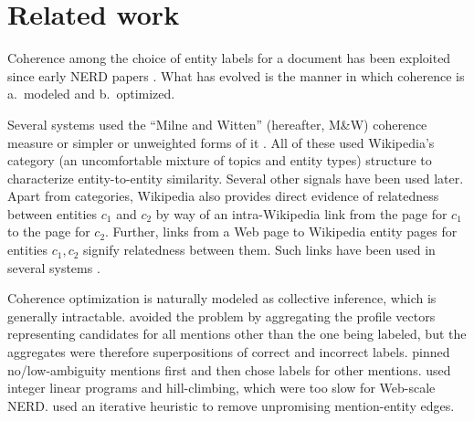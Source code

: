 \section{Related work}
\label{sec:related}

Coherence among the choice of entity labels for a document has been exploited since early NERD papers \cite{Cucerzan07,Milne2008}.  What has evolved is the manner in which coherence is a.~modeled and b.~optimized.

Several systems \cite{Milne2008,KulkarniSRC09,Hoffart2011} used the ``Milne and Witten'' (hereafter, M\&W) coherence measure \cite{Milne2008} or simpler or unweighted forms of it \cite{Cucerzan07}.  All of these used Wikipedia's category (an uncomfortable mixture of topics and entity types) structure to characterize entity-to-entity similarity.  Several other signals have been used later.  Apart from categories, Wikipedia also provides direct evidence of relatedness between entities $c_1$ and $c_2$ by way of an intra-Wikipedia link from the page for $c_1$ to the page for $c_2$.  Further, links from a Web page to Wikipedia entity pages for entities $c_1, c_2$ signify relatedness between them.  Such links have been used in several systems \cite{ChengR13,Chisholm2015}.

Coherence optimization is naturally modeled as collective inference, which is generally intractable.  \cite{Cucerzan07} avoided the problem by aggregating the profile vectors representing candidates for all mentions other than the one being labeled, but the aggregates were therefore superpositions of correct and incorrect labels.  \cite{Milne2008} pinned no/low-ambiguity mentions first and then chose labels for other mentions.  \cite{KulkarniSRC2009} used integer linear programs and hill-climbing, which were too slow for Web-scale NERD.  \cite{Hoffart2011} used an iterative heuristic to remove unpromising mention-entity edges.  

